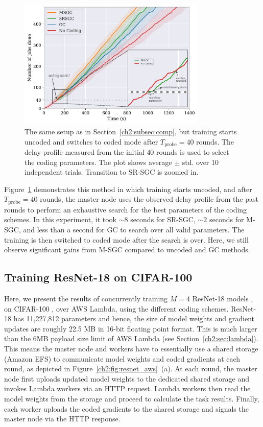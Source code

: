 \begin{figure}[h]
    \centering
    \includegraphics[width=0.8\textwidth]{figs/ch2/switch_annot2.pdf}
    \caption{The same setup as in Section~\ref{ch2:subsec:comp}, but training starts uncoded and switches to coded mode after $T_\text{probe}=40$ rounds. The delay profile measured from the initial $40$ rounds is used to select the coding parameters. The plot shows average $\pm$ std. over 10 independent trials. Transition to SR-SGC is zoomed in.}
    \label{ch2:fig:switch}
\end{figure}

Figure~\ref{ch2:fig:switch} demonstrates this method in which training starts uncoded, and after $T_\text{probe}=40$ rounds, the master node uses the observed delay profile from the past rounds to perform an exhaustive search for the best parameters of the coding schemes. In this experiment, it took $\sim 8$ seconds for SR-SGC, $\sim 2$ seconds for M-SGC, and less than a second for GC to search over all valid parameters. The training is then switched to coded mode after the search is over. Here, we still observe significant gains from M-SGC compared to uncoded and GC methods.


\FloatBarrier

\subsection{Training ResNet-18 on CIFAR-100}\label{ch2:sec:resnet}

Here, we present the results of concurrently training $M=4$ ResNet-18 models \cite{he2016deep}, on CIFAR-100 \cite{krizhevsky2009learning}, over AWS Lambda, using the different coding schemes. ResNet-18 has 11,227,812 parameters and hence, the size of model weights and gradient updates are roughly 22.5 MB in 16-bit floating point format. This is much larger than the 6MB payload size limit of AWS Lambda (see Section~\ref{ch2:sec:lambda}). This means the master node and workers have to essentially use a shared storage (Amazon EFS) to communicate model weights and coded gradients at each round, as depicted in Figure~\ref{ch2:fig:resnet_aws}~(a). At each round, the master node first uploads updated model weights to the dedicated shared storage and invokes Lambda workers via an HTTP request. Lambda workers then read the model weights from the storage and proceed to calculate the task results. Finally, each worker uploads the coded gradients to the shared storage and signals the master node via the HTTP response.

